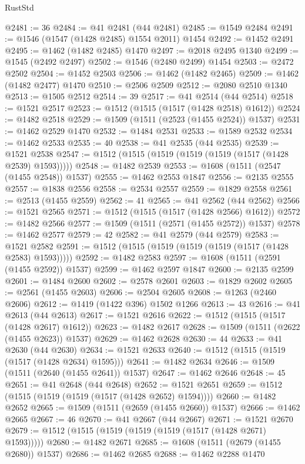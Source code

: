 \begin{lexlean}{RustStd}
\begin{coremodule}
{\begin{coremodule}
{{{{{{{{{{{{{{{{{{{{{{{{{{{{{{@2481 := 36
@2484 := @41 @2481 (@44 @2481)
@2485 := @1549 @2484
@2491 := @1546 (@1547 (@1428 @2485) @1554 @2011) @1454
@2492 := @1452 @2491
@2495 := @1462 (@1482 @2485) @1470
@2497 := @2018 @2495 @1340
@2499 := @1545 (@2492 @2497)
@2502 := @1546 (@2480 @2499) @1454
@2503 := @2472 @2502
@2504 := @1452 @2503
@2506 := @1462 (@1482 @2465)
@2509 := @1462 (@1482 @2477) @1470
@2510 := @2506 @2509
@2512 := @2080 @2510 @1340
@2513 := @1505 @2512
@2514 := 39
@2517 := @41 @2514 (@44 @2514)
@2518 := @1521 @2517
@2523 := @1512 (@1515 (@1517 (@1428 @2518) @1612))
@2524 := @1482 @2518
@2529 := @1509 (@1511 (@2523 (@1455 @2524)) @1537)
@2531 := @1462 @2529 @1470
@2532 := @1484 @2531
@2533 := @1589 @2532
@2534 := @1462 @2533
@2535 := 40
@2538 := @41 @2535 (@44 @2535)
@2539 := @1521 @2538
@2547 := @1512 (@1515 (@1519 (@1519 (@1519 (@1517 (@1428 @2539) @1593)))))
@2548 := @1482 @2539
@2553 := @1608 (@1511 (@2547 (@1455 @2548)) @1537)
@2555 := @1462 @2553 @1847
@2556 := @2135 @2555
@2557 := @1838 @2556
@2558 := @2534 @2557
@2559 := @1829 @2558
@2561 := @2513 (@1455 @2559)
@2562 := 41
@2565 := @41 @2562 (@44 @2562)
@2566 := @1521 @2565
@2571 := @1512 (@1515 (@1517 (@1428 @2566) @1612))
@2572 := @1482 @2566
@2577 := @1509 (@1511 (@2571 (@1455 @2572)) @1537)
@2578 := @1462 @2577
@2579 := 42
@2582 := @41 @2579 (@44 @2579)
@2583 := @1521 @2582
@2591 := @1512 (@1515 (@1519 (@1519 (@1519 (@1517 (@1428 @2583) @1593)))))
@2592 := @1482 @2583
@2597 := @1608 (@1511 (@2591 (@1455 @2592)) @1537)
@2599 := @1462 @2597 @1847
@2600 := @2135 @2599
@2601 := @1484 @2600
@2602 := @2578 @2601
@2603 := @1829 @2602
@2605 := @2561 (@1455 @2603)
@2606 := @2504 @2605
@2608 := @1263 (@2460 @2606)
@2612 := @1419 (@1422 @396) @1502 @1266
@2613 := 43
@2616 := @41 @2613 (@44 @2613)
@2617 := @1521 @2616
@2622 := @1512 (@1515 (@1517 (@1428 @2617) @1612))
@2623 := @1482 @2617
@2628 := @1509 (@1511 (@2622 (@1455 @2623)) @1537)
@2629 := @1462 @2628
@2630 := 44
@2633 := @41 @2630 (@44 @2630)
@2634 := @1521 @2633
@2640 := @1512 (@1515 (@1519 (@1517 (@1428 @2634) @1595)))
@2641 := @1482 @2634
@2646 := @1509 (@1511 (@2640 (@1455 @2641)) @1537)
@2647 := @1462 @2646
@2648 := 45
@2651 := @41 @2648 (@44 @2648)
@2652 := @1521 @2651
@2659 := @1512 (@1515 (@1519 (@1519 (@1517 (@1428 @2652) @1594))))
@2660 := @1482 @2652
@2665 := @1509 (@1511 (@2659 (@1455 @2660)) @1537)
@2666 := @1462 @2665
@2667 := 46
@2670 := @41 @2667 (@44 @2667)
@2671 := @1521 @2670
@2679 := @1512 (@1515 (@1519 (@1519 (@1519 (@1517 (@1428 @2671) @1593)))))
@2680 := @1482 @2671
@2685 := @1608 (@1511 (@2679 (@1455 @2680)) @1537)
@2686 := @1462 @2685
@2688 := @1462 @2288 @1470
}}}}}}}}}}}}}}}}}}}}}}}}}}}}}}
\end{coremodule}}
\end{coremodule}
\end{lexlean}
